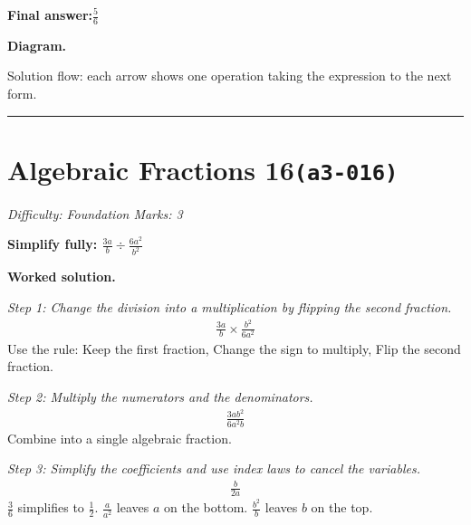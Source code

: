\documentclass[11pt]{article}
\newcommand{\question}[1]{\par\medskip\noindent\textbf{#1}\par}
\begin{document}
\begin{answerbox}
\textbf{Final answer:}\quad \(\displaystyle \frac{5}{6}\)
\end{answerbox}
\textbf{Diagram.}

\begin{center}
\end{center}
\small Solution flow: each arrow shows one operation taking the expression to the next form.\normalsize

\medskip\hrule

\section*{Algebraic Fractions 16\quad\small\texttt{(a3-016)}}
\textit{Difficulty: Foundation \quad\textbar\quad Marks: 3}

\question{Simplify fully: \( \frac{3a}{b} \div \frac{6a^2}{b^2} \)}

\textbf{Worked solution.}

\textit{Step 1: Change the division into a multiplication by flipping the second fraction.}
\[\begin{gathered}
\frac{3a}{b} \times \frac{b^2}{6a^2}
\end{gathered}\]
Use the rule: Keep the first fraction, Change the sign to multiply, Flip the second fraction.

\textit{Step 2: Multiply the numerators and the denominators.}
\[\begin{gathered}
\frac{3ab^2}{6a^2b}
\end{gathered}\]
Combine into a single algebraic fraction.

\textit{Step 3: Simplify the coefficients and use index laws to cancel the variables.}
\[\begin{gathered}
\frac{b}{2a}
\end{gathered}\]
\( \frac{3}{6} \) simplifies to \( \frac{1}{2} \). \( \frac{a}{a^2} \) leaves \( a \) on the bottom. \( \frac{b^2}{b} \) leaves \( b \) on the top.
\end{document}
